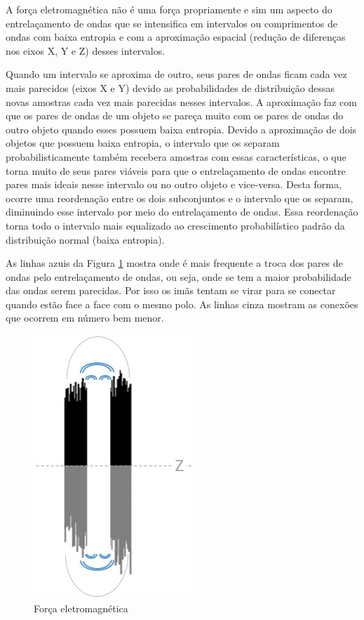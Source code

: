 A força eletromagnética não é uma força propriamente e sim um aspecto do entrelaçamento de ondas que se intensifica em intervalos ou comprimentos de ondas com baixa entropia e com a aproximação espacial (redução de diferenças nos eixos X, Y e Z) desses intervalos.

Quando um intervalo se aproxima de outro, seus pares de ondas ficam cada vez mais parecidos (eixos X e Y) devido as probabilidades de distribuição dessas novas amostras cada vez mais parecidas nesses intervalos. A aproximação faz com que os pares de ondas de um objeto se pareça muito com os pares de ondas do outro objeto quando esses possuem baixa entropia. Devido a aproximação de dois objetos que possuem baixa entropia, o intervalo que os separam probabilisticamente também recebera amostras com essas características, o que torna muito de seus pares viáveis para que o entrelaçamento de ondas encontre pares mais ideais nesse intervalo ou no outro objeto e vice-versa. Desta forma, ocorre uma reordenação entre os dois subconjuntos e o intervalo que os separam, diminuindo esse intervalo por meio do entrelaçamento de ondas. Essa reordenação torna todo o intervalo mais equalizado ao crescimento probabilístico padrão da distribuição normal (baixa entropia).

As linhas azuis da Figura \ref{fig:consciousness_electromaagnetic_force} mostra onde é mais frequente a troca dos pares de ondas pelo entrelaçamento de ondas, ou seja, onde se tem a maior probabilidade das ondas serem parecidas. Por isso os imãs tentam se virar para se conectar quando estão face a face com o mesmo polo. As linhas cinza mostram as conexões que ocorrem em número bem menor. 
	\begin{figure}[H]
	\caption{Força eletromagnética}
	\label{fig:consciousness_electromaagnetic_force}
	\centering
	\includegraphics[scale=.7]{sections/images/consciousness_electromaagnetic_force.jpg}
	\end{figure}

